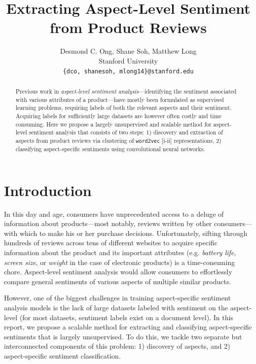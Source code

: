 \documentclass{article} %
\title{  Extracting Aspect-Level Sentiment from Product Reviews  }
\author{
Desmond C. Ong, Shane Soh, Matthew Long \\
Stanford University \\
\texttt{\{dco, shanesoh, mlong14\}@stanford.edu}
}
\begin{document}
\maketitle

\begin{abstract}
Previous work in \textit{aspect-level sentiment analysis}---identifying the sentiment associated with various attributes of a product---have mostly been formulated as supervised learning problems, requiring labels of both the relevant aspects and their sentiment. Acquiring labels for sufficiently large datasets are however often costly and time consuming. Here we propose a largely unsupervised and scalable method for aspect-level sentiment analysis that consists of two steps: 1) discovery and extraction of aspects from product reviews via clustering of \texttt{word2vec} [i-ii] representations, 2) classifying aspect-specific sentiments using convolutional neural networks.
\end{abstract}

\section{Introduction}

In this day and age, consumers have unprecedented access to a deluge of information about products---most notably, reviews written by other consumers---with which to make his or her purchase decisions. Unfortunately, sifting through hundreds of reviews across tens of different websites to acquire specific information about the product and its important attributes (e.g. \textit{battery life}, \textit{screen size}, or \textit{weight} in the case of electronic products) is a time-consuming chore. Aspect-level sentiment analysis would allow consumers to effortlessly compare general sentiments of various aspects of multiple similar products.

However, one of the biggest challenges in training aspect-specific sentiment analysis models is the lack of large datasets labeled with sentiment on the aspect-level (for most datasets, sentiment labels exist on a document level). In this report, we propose a scalable method for extracting and classifying aspect-specific sentiments that is largely unsupervised. To do this, we tackle two separate but interconnected components of this problem: 1) discovery of aspects, and 2) aspect-specific sentiment classification.
\end{document}
